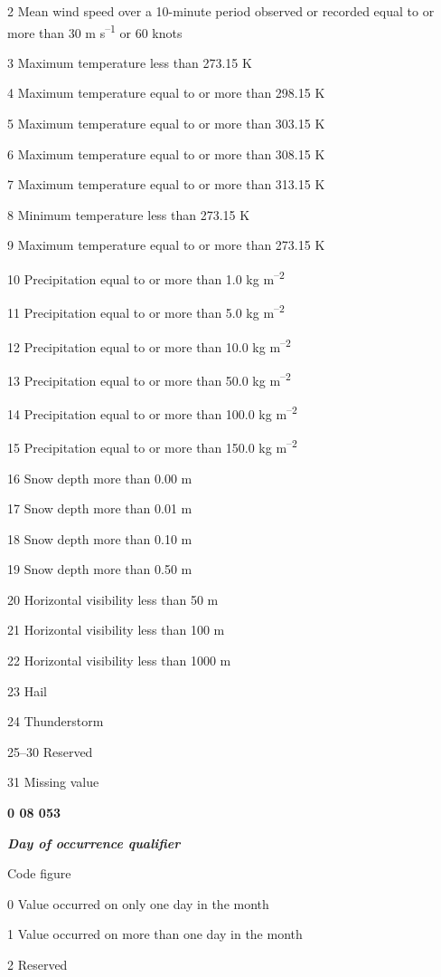 2 Mean wind speed over a 10-minute period observed or recorded equal to or more than 30 m s\textsuperscript{--1} or 60 knots

3 Maximum temperature less than 273.15 K

4 Maximum temperature equal to or more than 298.15 K

5 Maximum temperature equal to or more than 303.15 K

6 Maximum temperature equal to or more than 308.15 K

7 Maximum temperature equal to or more than 313.15 K

8 Minimum temperature less than 273.15 K

9 Maximum temperature equal to or more than 273.15 K

10 Precipitation equal to or more than 1.0 kg m\textsuperscript{--2}

11 Precipitation equal to or more than 5.0 kg m\textsuperscript{--2}

12 Precipitation equal to or more than 10.0 kg m\textsuperscript{--2}

13 Precipitation equal to or more than 50.0 kg m\textsuperscript{--2}

14 Precipitation equal to or more than 100.0 kg m\textsuperscript{--2}

15 Precipitation equal to or more than 150.0 kg m\textsuperscript{--2}

16 Snow depth more than 0.00 m

17 Snow depth more than 0.01 m

18 Snow depth more than 0.10 m

19 Snow depth more than 0.50 m

20 Horizontal visibility less than 50 m

21 Horizontal visibility less than 100 m

22 Horizontal visibility less than 1000 m

23 Hail

24 Thunderstorm

25--30 Reserved

31 Missing value

\textbf{0 08 053}

\emph{\textbf{Day of occurrence qualifier}}

Code figure

0 Value occurred on only one day in the month

1 Value occurred on more than one day in the month

2 Reserved

